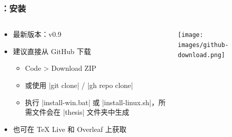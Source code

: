 \begin{frame}[fragile]
\frametitle{：安装}
\begin{columns}
\begin{column}{0.7\textwidth}
  \begin{itemize}
    \item<+-> 最新版本：v0.9
    \item<+-> 建议直接从 GitHub 下载 

      \begin{itemize}
        \item Code > Download ZIP
        \item 或使用 |git clone| / |gh repo clone|
        \item 执行 |install-win.bat| 或 |install-linux.sh|，所需文件会在 |thesis| 文件夹中生成
      \end{itemize}

    \item<+-> 也可在 \TeX{} Live 和 Overleaf
      上获取
  \end{itemize}
\end{column}
\begin{column}{0.26\textwidth}
  \texttt{[image: images/github-download.png]}
\end{column}
\end{columns}
\end{frame}


